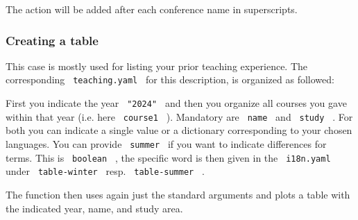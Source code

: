 The action will be added after each conference name in superscripts.

\subsubsection{Creating a table}\label{creating-a-table}

This case is mostly used for listing your prior teaching experience. The
corresponding \texttt{\ teaching.yaml\ } for this description, is
organized as followed:

\begin{Shaded}
\begin{Highlighting}[]
\KeywordTok{:}
\AttributeTok{  }\KeywordTok{:}
\AttributeTok{    }\KeywordTok{:}
\AttributeTok{    }\KeywordTok{:}
\AttributeTok{      }\KeywordTok{:}\AttributeTok{ }
\AttributeTok{      }\KeywordTok{:}\AttributeTok{ }
\AttributeTok{      }\KeywordTok{:}\AttributeTok{ }
\AttributeTok{    }\KeywordTok{:}
\AttributeTok{      }\KeywordTok{:}
\AttributeTok{      }\KeywordTok{:}
\AttributeTok{      }\KeywordTok{:}
\end{Highlighting}
\end{Shaded}

First you indicate the year \texttt{\ "2024"\ } and then you organize
all courses you gave within that year (i.e. here \texttt{\ course1\ } ).
Mandatory are \texttt{\ name\ } and \texttt{\ study\ } . For both you
can indicate a single value or a dictionary corresponding to your chosen
languages. You can provide \texttt{\ summer\ } if you want to indicate
differences for terms. This is \texttt{\ boolean\ } , the specific word
is then given in the \texttt{\ i18n.yaml\ } under
\texttt{\ table-winter\ } resp. \texttt{\ table-summer\ } .

The function then uses again just the standard arguments and plots a
table with the indicated year, name, and study area.

\begin{Shaded}
\begin{Highlighting}[]

\end{Highlighting}
\end{Shaded}

